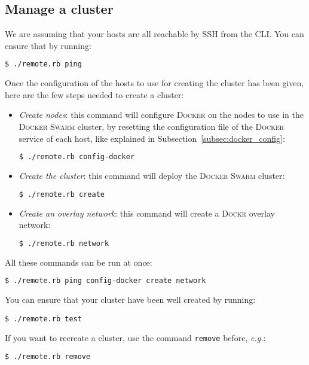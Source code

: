 
\subsection{Manage a cluster}
\label{subsec:clustersetup:manage}

We are assuming that your hosts are all reachable by SSH from the CLI.
You can ensure that by running:

\begin{lstlisting}[language=bash, basicstyle=\small]
$ ./remote.rb ping
\end{lstlisting}

Once the configuration of the hosts to use for creating the cluster has been given, here are the few steps needed to create a cluster:

\begin{itemize}
  \item \emph{Create nodes}: this command will configure \textsc{Docker} on the nodes to use in the \textsc{Docker Swarm} cluster, by resetting the configuration file of the \textsc{Docker} service of each host, like explained in Subsection~\ref{subsec:docker_config}:
    \begin{lstlisting}[language=bash, basicstyle=\small]
  $ ./remote.rb config-docker
    \end{lstlisting}
  \item \emph{Create the cluster}: this command will deploy the \textsc{Docker Swarm} cluster:
    \begin{lstlisting}[language=bash, basicstyle=\small]
  $ ./remote.rb create
    \end{lstlisting}
  \item \emph{Create an overlay network}: this command will create a \textsc{Dockr} overlay network:
    \begin{lstlisting}[language=bash, basicstyle=\small]
  $ ./remote.rb network
    \end{lstlisting}
\end{itemize}

All these commands can be run at once:

\begin{lstlisting}[language=bash, basicstyle=\small]
    $ ./remote.rb ping config-docker create network
\end{lstlisting}

You can ensure that your cluster have been well created by running:

\begin{lstlisting}[basicstyle=\small]
$ ./remote.rb test
\end{lstlisting}

If you want to recreate a cluster, use the command \texttt{remove} before, \textit{e.g.}:

\begin{lstlisting}[language=bash, basicstyle=\small]
    $ ./remote.rb remove
\end{lstlisting}

